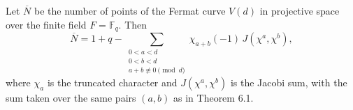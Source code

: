Let $\overline{N}$ be the number of points of the Fermat curve $V(d)$ in projective space over the finite field $F = \mathbb{F}_q$. Then
$$\overline{N} = 1 + q - \sum_{\substack{0 < a < d \\ 0 < b < d \\ a + b \not\equiv 0 \pmod{d}}} \chi_{a+b}(-1) \, J(\chi^a, \chi^b),$$
where $\chi_a$ is the truncated character and $J(\chi^a, \chi^b)$ is the Jacobi sum, with the sum taken over the same pairs $(a,b)$ as in Theorem 6.1.
